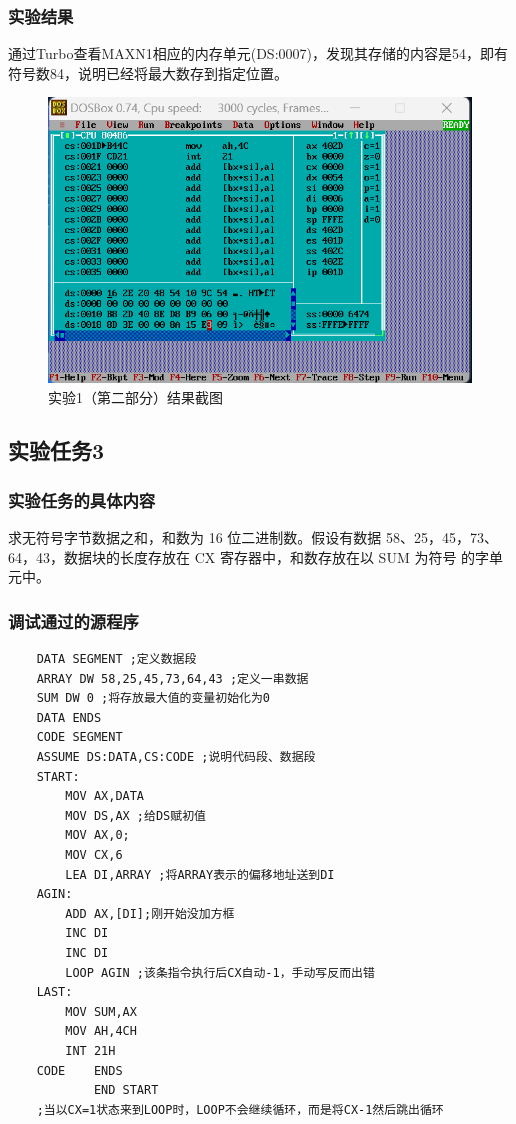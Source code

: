 \documentclass[12pt, a4paper, oneside]{ctexart}
\begin{document}
\subsubsection{实验结果}
通过Turbo查看MAXN1相应的内存单元(DS:0007)，发现其存储的内容是54，即有符号数84，说明已经将最大数存到指定位置。
\begin{figure}[H]
    \centering
    \includegraphics[scale=1]{pic/exp1_2.png}
    \caption{实验1（第二部分）结果截图}
\end{figure}
\subsection{实验任务3}
\subsubsection{实验任务的具体内容}
求无符号字节数据之和，和数为 16 位二进制数。假设有数据 58、25，45，73、64，43，数据块的长度存放在 CX 寄存器中，和数存放在以 SUM 为符号
的字单元中。 
\subsubsection{调试通过的源程序}
\begin{lstlisting}
    DATA SEGMENT ;定义数据段
    ARRAY DW 58,25,45,73,64,43 ;定义一串数据
    SUM DW 0 ;将存放最大值的变量初始化为0 
    DATA ENDS
    CODE SEGMENT 
    ASSUME DS:DATA,CS:CODE ;说明代码段、数据段
    START: 
        MOV AX,DATA 
        MOV DS,AX ;给DS赋初值
        MOV AX,0;
        MOV CX,6
        LEA DI,ARRAY ;将ARRAY表示的偏移地址送到DI
    AGIN:
        ADD AX,[DI];刚开始没加方框
        INC DI
        INC DI
        LOOP AGIN ;该条指令执行后CX自动-1，手动写反而出错
    LAST:
        MOV SUM,AX
        MOV AH,4CH
        INT 21H
    CODE 	ENDS
            END START
    ;当以CX=1状态来到LOOP时，LOOP不会继续循环，而是将CX-1然后跳出循环
\end{lstlisting}
\end{document}
